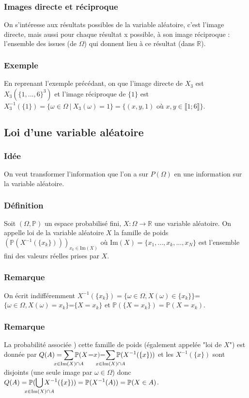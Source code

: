 \documentclass[a4paper,10pt]{book} %
\newcommand{\R}{\mathbb{R}}
\renewcommand{\P}{\mathbb{P}} %
\newcommand{\tq}{~|~}
\newcommand{\Ima}{\mathrm{Im}} %
\begin{document}
\subsubsection{Images directe et réciproque}
On s'intéresse aux résultats possibles de la variable aléatoire, c'est l'image directe, mais aussi pour chaque résultat x possible, à son image réciproque : l'ensemble des issues (de $\Omega$) qui donnent lieu à ce résultat (dans $\R$).

\subsubsection{Exemple} 
En reprenant l'exemple précédant, on que l'image directe de $X_3$ est $X_3(\{1,...,6\}^3)$ et l'image réciproque de $\{1\}$ est $X_3^{-1}(\{1\})=\{\omega\in \Omega\tq X_3(\omega)=1\}=\{(x,y,1)$ où $x,y\in \llbracket 1;6\rrbracket\}$.

\subsection{Loi d'une variable aléatoire}
\subsubsection{Idée}
On veut transformer l'information que l'on a sur $P(\Omega)$ en une information sur la variable aléatoire.

\subsubsection{Définition}
Soit $(\Omega,\P)$ un espace probabilisé fini, $X :\Omega \rightarrow \R$ une variable aléatoire. On appelle loi de la variable aléatoire $X$ la famille de poids $(\P(X^{-1}(\{x_k\})))_{x_k\in \Ima(X)}$ où $\Ima(X)=\{x_1,...,x_k,...,x_N\}$ est l'ensemble fini des valeurs réelles prises par $X$.

\subsubsection{Remarque}
On écrit indifféremment $X^{-1}(\{x_k\})=\{\omega\in \Omega, X(\omega)\in \{x_k\}\}$=$\{\omega\in \Omega, X(\omega)=x_k\}$=$\{X=x_k\}$ et $\P(\{X=x_k\})=\P(X=x_k)$.

\subsubsection{Remarque}
La probabilité associée ) cette famille de poids (également appelée "loi de $X$") est donnée par $\displaystyle Q(A)=\sum_{\mathclap{x\in \Ima(X)\cap A}}\P(X$=$x)$=$\displaystyle \sum_{\mathclap{x\in \Ima(X)\cap A}}\P(X^{-1}(\{x\}))$ et les $X^{-1}(\{x\})$ sont disjoints (une seule image par $\omega\in \Omega$) donc $\displaystyle Q(A)=\P(\bigcup_{\mathclap{x\in \Ima(X)\cap A}} X^{-1}(\{x\}))=\P(X^{-1}(A))=\P(X\in A)$.
\end{document}
